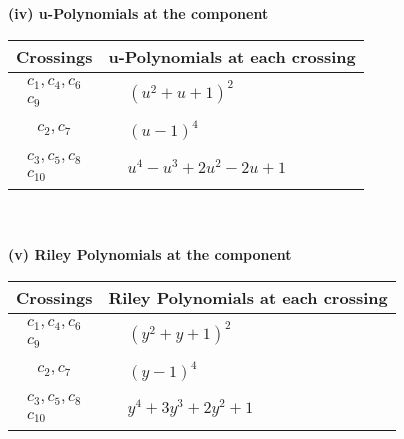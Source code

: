 \documentclass[1p]{elsarticle_modified}
\theoremstyle{definition}
\begin{document}
\newpage\renewcommand{\arraystretch}{1}
\flushleft \textbf{(iv) u-Polynomials at the component}\newline \\
\begin{tabular}{m{50pt}|m{274pt}}
Crossings & \hspace{64pt}u-Polynomials at each crossing \\
\hline $$\begin{aligned}c_{1},c_{4},c_{6}\\c_{9}\end{aligned}$$&$\begin{aligned}
&(u^2+u+1)^2
\end{aligned}$\\
\hline $$\begin{aligned}c_{2},c_{7}\end{aligned}$$&$\begin{aligned}
&(u-1)^4
\end{aligned}$\\
\hline $$\begin{aligned}c_{3},c_{5},c_{8}\\c_{10}\end{aligned}$$&$\begin{aligned}
&u^4- u^3+2 u^2-2 u+1
\end{aligned}$\\
\hline
\end{tabular}\\~\\
\newpage\renewcommand{\arraystretch}{1}
\flushleft \textbf{(v) Riley Polynomials at the component}\newline \\
\begin{tabular}{m{50pt}|m{274pt}}
Crossings & \hspace{64pt}Riley Polynomials at each crossing \\
\hline $$\begin{aligned}c_{1},c_{4},c_{6}\\c_{9}\end{aligned}$$&$\begin{aligned}
&(y^2+y+1)^2
\end{aligned}$\\
\hline $$\begin{aligned}c_{2},c_{7}\end{aligned}$$&$\begin{aligned}
&(y-1)^4
\end{aligned}$\\
\hline $$\begin{aligned}c_{3},c_{5},c_{8}\\c_{10}\end{aligned}$$&$\begin{aligned}
&y^4+3 y^3+2 y^2+1
\end{aligned}$\\
\hline
\end{tabular}\\~\\
\end{document}
